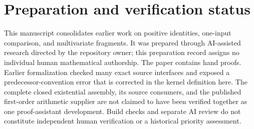 \documentclass[11pt,a4paper]{article}
\theoremstyle{definition}
\theoremstyle{remark}
\numberwithin{equation}{section}
\begin{document}
\section*{Preparation and verification status}

This manuscript consolidates earlier work on positive identities,
one-input comparison, and multivariate fragments.  It was prepared through
AI-assisted research directed by the repository owner; this preparation
record assigns no individual human mathematical authorship.  The paper
contains hand proofs.  Earlier formalization checked many exact source
interfaces and exposed a predecessor-convention error that is corrected
in the kernel definition here.  The complete closed existential assembly,
its source consumers, and the published first-order arithmetic supplier
are not claimed to have been verified together as one proof-assistant
development.  Build checks and separate AI review do not constitute
independent human verification or a historical priority assessment.


\end{document}
